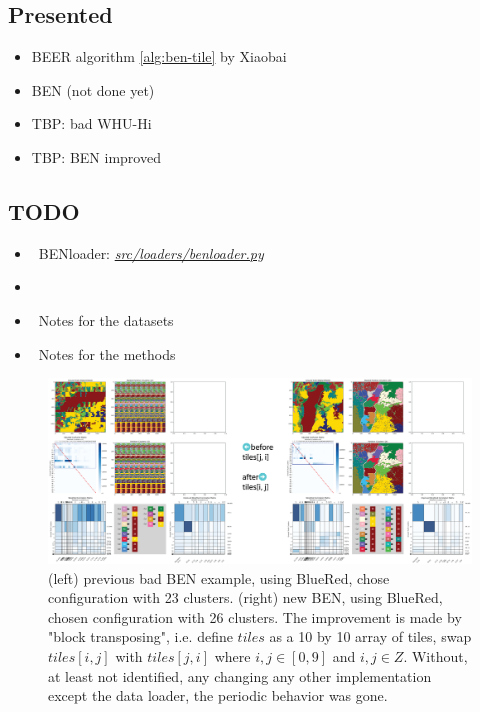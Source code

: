 

\begin{multicols}{2}
\subsection*{Presented}
\begin{itemize}
    \item BEER algorithm \ref{alg:ben-tile}  by Xiaobai
    \item BEN (not done yet)
    \item TBP: bad WHU-Hi
    \item TBP: BEN improved
\end{itemize}

\subsection*{TODO}
\begin{itemize}
    \item \checkmark \ BENloader: {\tiny \href{https://gitlab.oit.duke.edu/jw853/clustering4hsi/-/blob/main/src/loaders/benloader.py?ref_type=heads}{\textit{src/loaders/benloader.py}}}
    \item {}
    \item \checkmark \ Notes for the datasets
    \item \checkmark \ Notes for the methods
\end{itemize}
\end{multicols}


\begin{figure}[htbp]
    \centering
    \includegraphics[width=\linewidth]{figures/24-10-07_BENimprove.png}
    \caption{(left) previous bad BEN example, using BlueRed, chose configuration with 23 clusters. (right) new BEN, using BlueRed, chosen configuration with 26 clusters. The improvement is made by "block transposing", i.e. define $tiles$ as a 10 by 10 array of tiles, swap $tiles[i,j]$ with $tiles[j,i]$ where $i,j \in [0,9]$ and $i,j \in Z$. Without, at least not identified, any changing any other implementation except the data loader, the periodic behavior was gone. } 
    \label{fig:24-10-07_BENimrove}
\end{figure}

\newpage

